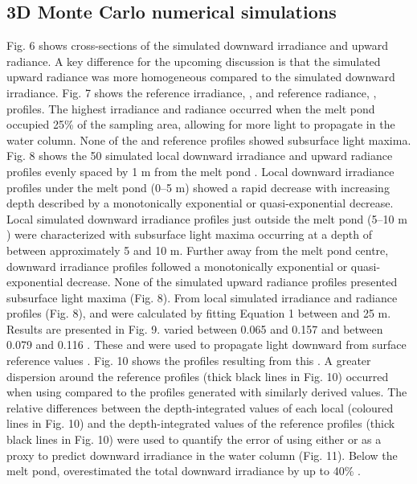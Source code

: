 \subsection{3D Monte Carlo numerical simulations}

Fig. 6 shows cross-sections of the simulated downward irradiance and upward radiance. A key difference for the upcoming discussion is that the simulated upward radiance was more homogeneous compared to the simulated downward irradiance. Fig. 7 shows the reference irradiance, \edz{}, and reference radiance, \luz{}, profiles. The highest irradiance and radiance occurred when the melt pond occupied 25\% of the sampling area, allowing for more light to propagate in the water column. None of the \edz{} and \luz{} reference profiles showed subsurface light maxima. Fig. 8 shows the 50 simulated local downward irradiance and upward radiance \DIFdelbegin {}\DIFdelend profiles evenly spaced by 1 m \DIFaddbegin {}\DIFaddend from the melt pond \DIFdelbegin {}\DIFdelend \DIFaddbegin {}\DIFaddend . Local downward irradiance profiles under the melt pond (0--5 m) showed a rapid decrease with increasing depth described by a monotonically exponential or quasi-exponential decrease. Local simulated downward irradiance profiles just outside the melt pond (5--10 m \DIFaddbegin {}\DIFaddend ) were characterized with subsurface light maxima occurring at a depth of between approximately 5 and 10 m. Further away from the melt pond centre, downward irradiance profiles followed a monotonically exponential or quasi-exponential decrease. None of the simulated upward radiance \DIFdelbegin {}\DIFdelend profiles presented subsurface light maxima (Fig. 8). From local simulated irradiance and radiance profiles (Fig. 8), \ked{} and \klu{} were calculated by fitting Equation 1 between \DIFaddbegin {} \DIFaddbegin {}\DIFaddend and 25 m. Results are presented in Fig. 9. \ked{} varied between 0.065 and 0.157 \mminus{} and \klu{} between 0.079 and 0.116 \mminus{}. These \ked{} and \klu{} were used to propagate light downward from surface reference values \edzero{}. Fig. 10 shows the profiles resulting from this \DIFdelbegin {}\DIFdelend \DIFaddbegin {}\DIFaddend . A greater dispersion around the reference profiles (thick black lines in Fig. 10) occurred when using \ked{} compared to the profiles generated with similarly derived \klu{} values. The relative differences between the depth-integrated values of each local \DIFdelbegin {}\DIFdelend \DIFaddbegin {}\DIFaddend (coloured lines in Fig. 10) and the depth-integrated values of the reference profiles (thick black lines in Fig. 10) were used to quantify the error of using either \ked{} or \klu{} as a proxy to predict downward irradiance in the water column (Fig. 11). Below the melt pond, \ked{} overestimated the total downward irradiance by up to 40\% \DIFdelbegin {}\DIFdelend \DIFaddbegin {}\DIFdelbegin {}\DIFdelend \DIFaddbegin {}\DIFaddend . 